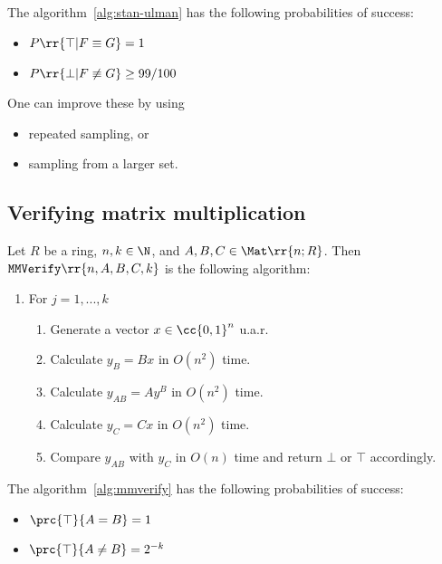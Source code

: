 \documentclass{article}
\begin{document}
\begin{theorem}
  \label{thm:stan-ulman-probabilities}
  The algorithm~\ref{alg:stan-ulman} has the following probabilities of success:
  \begin{itemize}
    \item $P \rr{ \top | F\equiv G } = 1$
    \item $P \rr{ \bot | F\not\equiv G } \geq 99/100$
  \end{itemize}
  One can improve these by using
  \begin{itemize}
    \item repeated sampling, or
    \item sampling from a larger set.
  \end{itemize}
\end{theorem}

\subsection{Verifying matrix multiplication}

\begin{algorithm}\label{alg:mmverify}
  Let $R$ be a ring, $n,k\in\N$, and $A,B,C\in\Mat \rr{ n; R }$. Then
  $\texttt{MMVerify} \rr{ n, A, B, C, k }$ is the following algorithm:
  \begin{enumerate}
    \item For $j=1,...,k$ \begin{enumerate}
      \item Generate a vector $x\in \cc{ 0,1 }^n$ u.a.r.
      \item Calculate $y_B = Bx$ in $O(n^2)$ time.
      \item Calculate $y_{AB} = Ay^B$ in $O(n^2)$ time.
      \item Calculate $y_C = Cx$ in $O(n^2)$ time.
      \item Compare $y_{AB}$ with $y_C$ in $O(n)$ time and return $\bot$ or $\top$ accordingly.
    \end{enumerate}
\end{enumerate}
\end{algorithm}

\begin{theorem}
  \label{thm:mmverify-proabilities}
  The algorithm~\ref{alg:mmverify} has the following probabilities of success:
  \begin{itemize}
    \item $\prc{ \top}{A = B } = 1$
    \item $\prc{ \top}{A \not= B } = 2^{-k}$
  \end{itemize}
\end{theorem}
\end{document}
